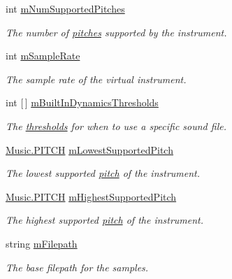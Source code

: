 \begin{DoxyCompactItemize}
int \hyperlink{group___v_i_base_pro_var_gafc759a16324cf9b3f230bcbf040afcd2}{m\+Num\+Supported\+Pitches}
\begin{DoxyCompactList}\small\item\em The number of \hyperlink{group___music_enums_ga508f69b199ea518f935486c990edac1d}{pitches} supported by the instrument. \end{DoxyCompactList}\item 
int \hyperlink{group___v_i_base_pro_var_ga80b3d2ff29b27698eea6bcf2f8ddc5d7}{m\+Sample\+Rate}
\begin{DoxyCompactList}\small\item\em The sample rate of the virtual instrument. \end{DoxyCompactList}\item 
int \mbox{[}$\,$\mbox{]} \hyperlink{group___v_i_base_pro_var_gae3db4264dc2a96e99ea680c6d637e6bf}{m\+Built\+In\+Dynamics\+Thresholds}
\begin{DoxyCompactList}\small\item\em The \hyperlink{group___audio_DefBIDThresh}{thresholds} for when to use a specific sound file. \end{DoxyCompactList}\item 
\hyperlink{group___music_enums_ga508f69b199ea518f935486c990edac1d}{Music.\+P\+I\+T\+CH} \hyperlink{group___v_i_base_pro_var_ga3cae52b1bcc0178a8a6b03c7aaf7aac8}{m\+Lowest\+Supported\+Pitch}
\begin{DoxyCompactList}\small\item\em The lowest supported \hyperlink{group___music_enums_ga508f69b199ea518f935486c990edac1d}{pitch} of the instrument. \end{DoxyCompactList}\item 
\hyperlink{group___music_enums_ga508f69b199ea518f935486c990edac1d}{Music.\+P\+I\+T\+CH} \hyperlink{group___v_i_base_pro_var_ga61fb2c33b53a0f663047779d7ceb18f3}{m\+Highest\+Supported\+Pitch}
\begin{DoxyCompactList}\small\item\em The highest supported \hyperlink{group___music_enums_ga508f69b199ea518f935486c990edac1d}{pitch} of the instrument. \end{DoxyCompactList}\item 
string \hyperlink{group___v_i_base_pro_var_gac428224be859933d720a9c533fdb5643}{m\+Filepath}
\begin{DoxyCompactList}\small\item\em The base filepath for the samples. \end{DoxyCompactList}\item 

\end{DoxyCompactItemize}
